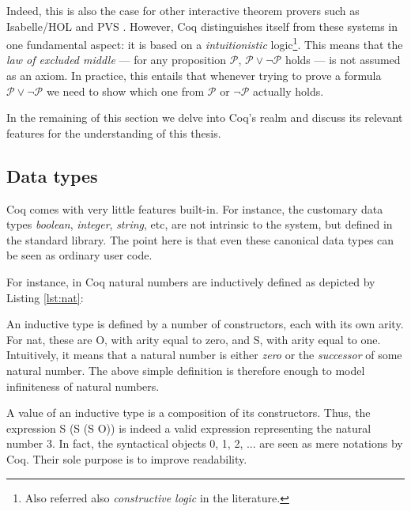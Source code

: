 	
		
	Indeed, this is also the case for other interactive theorem provers such as 
	Isabelle/HOL \cite{Nipkow-Paulson-Wenzel:2002} and PVS \cite{cade92-pvs}. However, Coq distinguishes 
	itself from these systems in one fundamental aspect: it is based on a \textit{intuitionistic}
	logic\footnote{Also referred also \textit{constructive logic} in the literature.}. This means that 
	the \textit{law of excluded middle} --- for any proposition $\mathcal{P}$, $\mathcal{P}  \lor \neg \mathcal{P}$ 
	holds --- is not assumed as an axiom. In practice, this entails that whenever trying to prove 
	a formula $\mathcal{P}  \lor \neg \mathcal{P}$  we need to show which one from $\mathcal{P}$ or $\neg \mathcal{P}$
	actually holds.

		
	In the remaining of this section we delve into Coq's realm and discuss 
	its relevant features for the understanding of this thesis.
	
	

\subsection{Data types}
\label{sub:dtcoq}	
		
	Coq comes with very little features built-in. For instance, the customary
	data types \textit{boolean}, \textit{integer}, \textit{string}, etc, are
	not intrinsic to the system, but defined in the standard library. The point
	here is that even these canonical data types can be seen as 
	ordinary user code.
			
	 For instance, in Coq natural numbers are inductively defined as depicted by Listing \ref{lst:nat}:
	
		
		
	
	\noindent An inductive type is defined by a number of constructors, each with
	its own arity. For \textsf{nat}, these are \textsf{O}, with arity equal to zero,
	and \textsf{S}, with arity equal to one. Intuitively, it means that a 
	natural number is either \textit{zero} or the \textit{successor}
	of some natural number. The above simple definition	 is therefore 
	enough to model infiniteness of natural numbers. 
	
	A value of an inductive type is a composition of its constructors. Thus,
	the expression \textsf{S (S (S O))} is indeed a valid expression representing
	the natural number 3. In fact, the syntactical
	objects \textsf{0}, \textsf{1}, \textsf{2}, ... are seen as mere notations by Coq.
	Their sole purpose is to improve readability.
			
